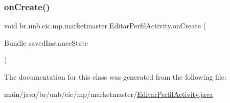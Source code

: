 \subsubsection{\texorpdfstring{on\+Create()}{onCreate()}}
{\footnotesize\ttfamily void br.\+unb.\+cic.\+mp.\+marketmaster.\+Editar\+Perfil\+Activity.\+on\+Create (\begin{DoxyParamCaption}\item[{Bundle}]{saved\+Instance\+State }\end{DoxyParamCaption})\hspace{0.3cm}{\ttfamily [protected]}}



The documentation for this class was generated from the following file\+:\begin{DoxyCompactItemize}
\item 
main/java/br/unb/cic/mp/marketmaster/\mbox{\hyperlink{EditarPerfilActivity_8java}{Editar\+Perfil\+Activity.\+java}}\end{DoxyCompactItemize}
